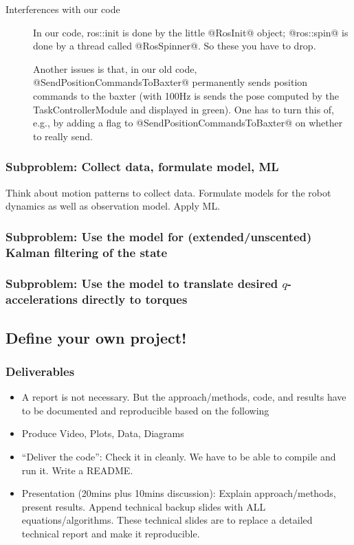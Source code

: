 \documentclass[10pt,fleqn,twoside]{article}
\newenvironment{code}{\footnotesize}{}
\begin{document}
\begin{description}
\begin{code}
\begin{Verbatim}
\end{Verbatim}
\end{code}

\item[Interferences with our code] In our code, ros::init is done by the little
  @RosInit@ object; @ros::spin@ is done by a thread called
  @RosSpinner@. So these you have to drop.

  Another issues is that, in our old code,
  @SendPositionCommandsToBaxter@ permanently sends position commands
  to the baxter (with 100Hz is sends the pose computed
  by the TaskControllerModule and displayed in green). One has to
  turn this of, e.g., by adding a flag to
  @SendPositionCommandsToBaxter@ on whether to really send.
\end{description}



\subsubsection{Subproblem: Collect data, formulate model, ML}

Think about motion patterns to collect data. Formulate models for the
robot dynamics as well as observation model. Apply ML.

\subsubsection{Subproblem: Use the model for (extended/unscented)
  Kalman filtering of the state}


\subsubsection{Subproblem: Use the model to translate desired
  $q$-accelerations directly to torques}



\subsection{Define your own project!}

\subsubsection{Deliverables}
\begin{itemize}
\item A report is not necessary. But the approach/methods, code, and
  results have to be documented and reproducible based on the following
\item Produce Video, Plots, Data, Diagrams
\item ``Deliver the code'': Check it in cleanly. We have to be able to
  compile and run it. Write a README.
\item Presentation (20mins plus 10mins discussion): Explain
  approach/methods, present results.  Append technical backup slides
  with ALL equations/algorithms. These technical slides are to replace
  a detailed technical report and make it reproducible.
\end{itemize}
\end{document}
